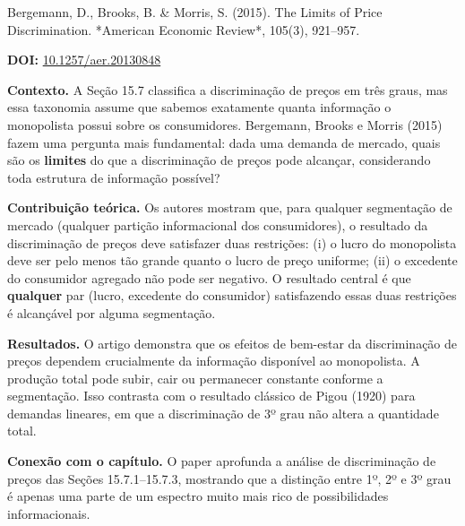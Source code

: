 \documentclass[11pt,twoside,openright]{book}
\begin{document}
\begin{pesquisabox}{Bergemann, D., Brooks, B. & Morris, S. (2015). The Limits of Price Discrimination. *American Economic Review*, 105(3), 921–957.}

\textbf{DOI:}
\href{https://doi.org/10.1257/aer.20130848}{10.1257/aer.20130848}

\textbf{Contexto.} A Seção 15.7 classifica a discriminação de preços em
três graus, mas essa taxonomia assume que sabemos exatamente quanta
informação o monopolista possui sobre os consumidores. Bergemann, Brooks
e Morris (2015) fazem uma pergunta mais fundamental: dada uma demanda de
mercado, quais são os \textbf{limites} do que a discriminação de preços
pode alcançar, considerando toda estrutura de informação possível?

\textbf{Contribuição teórica.} Os autores mostram que, para qualquer
segmentação de mercado (qualquer partição informacional dos
consumidores), o resultado da discriminação de preços deve satisfazer
duas restrições: (i) o lucro do monopolista deve ser pelo menos tão
grande quanto o lucro de preço uniforme; (ii) o excedente do consumidor
agregado não pode ser negativo. O resultado central é que
\textbf{qualquer} par (lucro, excedente do consumidor) satisfazendo
essas duas restrições é alcançável por alguma segmentação.

\textbf{Resultados.} O artigo demonstra que os efeitos de bem-estar da
discriminação de preços dependem crucialmente da informação disponível
ao monopolista. A produção total pode subir, cair ou permanecer
constante conforme a segmentação. Isso contrasta com o resultado
clássico de Pigou (1920) para demandas lineares, em que a discriminação
de 3º grau não altera a quantidade total.

\textbf{Conexão com o capítulo.} O paper aprofunda a análise de
discriminação de preços das Seções 15.7.1--15.7.3, mostrando que a
distinção entre 1º, 2º e 3º grau é apenas uma parte de um espectro muito
mais rico de possibilidades informacionais.

\end{pesquisabox}
\end{document}
